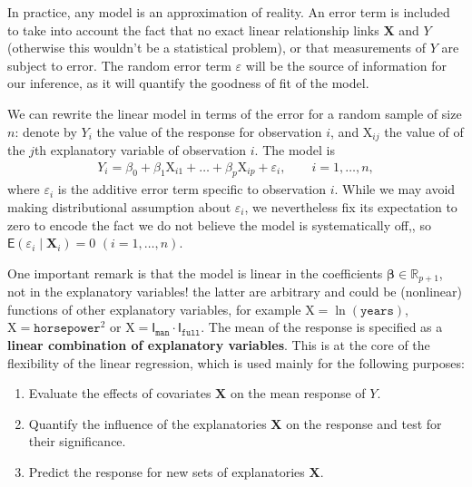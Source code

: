 \documentclass[
  11pt,
  letterpaper,
]{book}
\providecommand{\tightlist}{%
  \setlength{\itemsep}{0pt}\setlength{\parskip}{0pt}}
\theoremstyle{definition}
\theoremstyle{definition}
\theoremstyle{definition}
\theoremstyle{definition}
\theoremstyle{remark}
\begin{document}
In practice, any model is an approximation of reality. An error term is included to take into account the fact that no exact linear relationship links \(\mathbf{X}\) and \(Y\) (otherwise this wouldn't be a statistical problem), or that measurements of \(Y\) are subject to error. The random error term \(\varepsilon\) will be the source of information for our inference, as it will quantify the goodness of fit of the model.

We can rewrite the linear model in terms of the error for a random sample of size \(n\): denote by \(Y_i\) the value of the response for observation \(i\), and \(\mathrm{X}_{ij}\) the value of of the \(j\)th explanatory variable of observation \(i\). The model is
\begin{align}
Y_i = \beta_0 + \beta_1 \mathrm{X}_{i1} + \ldots + \beta_p \mathrm{X}_{ip} +\varepsilon_{i}, \qquad i =1, \ldots, n, \label{eq:olsmean}
\end{align}
where \(\varepsilon_i\) is the additive error term specific to observation \(i\). While we may avoid making distributional assumption about \(\varepsilon_i\), we nevertheless fix its expectation to zero to encode the fact we do not believe the model is systematically off,, so \(\mathsf{E}(\varepsilon_i \mid \boldsymbol{X}_i)=0\) \((i=1, \ldots, n)\).

One important remark is that the model is linear in the coefficients \(\boldsymbol{\beta}\in \mathbb{R}_{p+1}\), not in the explanatory variables! the latter are arbitrary and could be (nonlinear) functions of other explanatory variables, for example \(\mathrm{X}=\ln(\texttt{years})\), \(\mathrm{X}=\texttt{horsepower}^2\) or \(\mathrm{X}= \mathsf{I}_{\texttt{man}}\cdot\mathsf{I}_{\texttt{full}}\). The mean of the response is specified as a \textbf{linear combination of explanatory variables}. This is at the core of the flexibility of the linear regression, which is used mainly for the following purposes:

\begin{enumerate}
\def\labelenumi{\arabic{enumi}.}
\tightlist
\item
  Evaluate the effects of covariates \(\mathbf{X}\) on the mean response
  of \(Y\).
\item
  Quantify the influence of the explanatories \(\mathbf{X}\) on the
  response and test for their significance.
\item
  Predict the response for new sets of explanatories \(\mathbf{X}\).
\end{enumerate}
\end{document}
